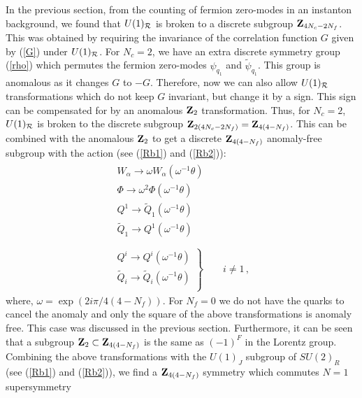 In the previous section, from the counting of fermion zero-modes in an
instanton background, we found that $U(1)_{\cal R}$ is broken to a
discrete subgroup ${\bf Z}_{4N_c-2N_f}$. This was obtained by
requiring the invariance of the correlation function $G$ given by
(\ref{G}) under $U(1)_{\cal R}$. For $N_c=2$, we have an extra
discrete symmetry group (\ref{rho}) which permutes the fermion
zero-modes $\psi_{q_1}$ and $\widetilde\psi_{q_1}$. This group is
anomalous as it changes $G$ to $-G$. Therefore, now we can also allow
$U(1)_{\cal R}$ transformations which do not keep $G$ invariant, but
change it by a sign. This sign can be compensated for by an anomalous
${\bf Z}_2$ transformation. Thus, for $N_c=2$, $U(1)_{\cal R}$ is
broken to the discrete subgroup ${\bf Z}_{2(4N_c-2N_f)}={\bf
Z}_{4(4-N_f)}$. This can be combined with the anomalous ${\bf Z}_2$ to
get a discrete ${\bf Z}_{4(4-N_f)}$ anomaly-free subgroup with the
action (see (\ref{Rb1}) and (\ref{Rb2})):
$$
\begin{array}{l}
\left.\begin{array}{l}
W_{\alpha} \rightarrow \omega W_{\alpha} (\omega^{-1} \theta )\\
\Phi \rightarrow \omega^2 \Phi (\omega^{-1} \theta )\\
Q^1  \rightarrow \widetilde Q_1 (\omega^{-1} \theta )\\
\widetilde Q_1  \rightarrow Q^1 (\omega^{-1} \theta ) \\
\end{array}\right. \\
\left.\begin{array}{l}
Q^i  \rightarrow Q^i (\omega^{-1} \theta )\\
\widetilde Q_i  \rightarrow \widetilde Q_i (\omega^{-1} \theta )\\
\end{array}\right\} \qquad i\not= 1\,,
\end{array}
$$
where, $\omega={\exp}(2i\pi/4(4-N_f))$. For $N_f = 0$ we do not have the
quarks to cancel the anomaly and only the square of the above
transformations is anomaly free. This case was discussed in the
previous section. Furthermore, it can be seen that a subgroup ${\bf
Z}_2 \subset {\bf Z}_{4(4-N_f)}$ is the same as $(-1)^F$ in the
Lorentz group. Combining the above transformations with the $U(1)_J$
subgroup of $SU(2)_R$ (see (\ref{Rb1}) and (\ref{Rb2})), we find a
${\bf Z}_{4(4-N_f)}$ symmetry which commutes $N=1$ supersymmetry
